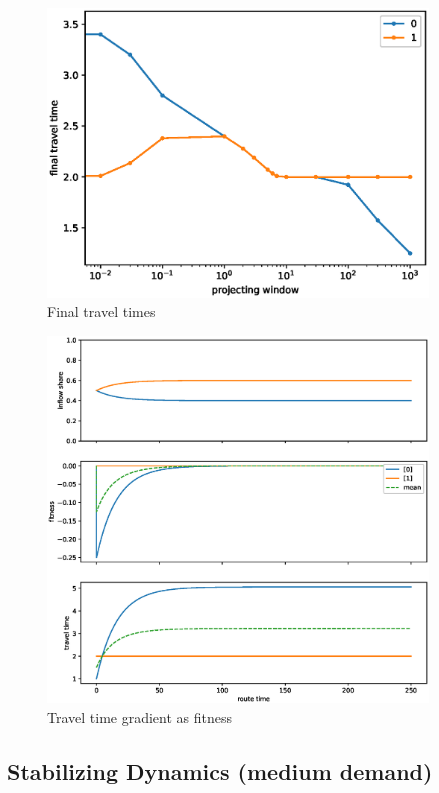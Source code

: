 \documentclass[12pt]{article}
\begin{document}
\begin{figure}
	\includegraphics[width=0.9\textwidth]{img/final_tt_proj.eps}
	\caption{ Final travel times }
	\label{fig:final_tt_proj}

\end{figure}

\begin{figure}
	\includegraphics[width=0.9\textwidth]{img/replicator_grad_tt.eps}
	\caption{ Travel time gradient as fitness }
	\label{fig:replicator_grad_tt}

\end{figure}

\newpage
\subsection*{Stabilizing Dynamics (medium demand)}
\end{document}
